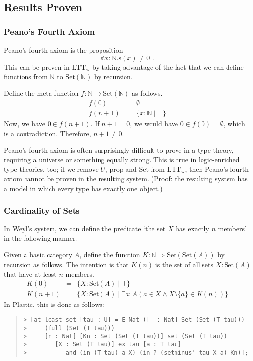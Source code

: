 \documentclass[acmtocl]{acmtrans2m}
\newcommand{\LTTW}{\ensuremath{\mathrm{LTT}_\mathrm{w}}}
\newcommand{\Set}[1]{\mathrm{Set} \left( {#1} \right)}
\newcommand{\s}{\mathrm{s}}
\newcommand{\p}{\mathrm{prop}}
\newcommand{\boldarrow}{\Rightarrow}
\begin{document}
\subsection{Results Proven}

\subsubsection{Peano's Fourth Axiom}
Peano's fourth axiom is the proposition
\[ \forall x : \mathbb{N}. \s(x) \neq 0 \enspace . \]
This can be proven in $\LTTW$ by taking advantage of the fact that we can define functions from $\mathbb{N}$ to $\Set{\mathbb{N}}$ by recursion.

Define the meta-function $f : \mathbb{N} \rightarrow \Set{\mathbb{N}}$ as follows.
\begin{eqnarray*}
f(0) & = & \emptyset \\
f(n+1) & = & \{ x : \mathbb{N} \mid \top \}
\end{eqnarray*}
Now, we have $0 \in f(n+1)$.  If $n+1 = 0$, we would have $0 \in f(0) = \emptyset$, which is a contradiction.  Therefore, $n+1 \neq 0$.

Peano's fourth axiom is often surprisingly difficult to prove in a type theory, requiring a universe or something equally strong.  This is true in logic-enriched type theories, too; if we remove $U$, $\p$ and $\mathrm{Set}$ from $\LTTW$, then Peano's fourth axiom cannot be proven in the resulting system.  (Proof: the resulting system has a model in which every type has exactly one object.)

\subsubsection{Cardinality of Sets}
\label{section:cardinality}

In Weyl's system, we can define the predicate `the set $X$ has
exactly $n$ members' in the following manner.

Given a basic category $A$, define the function $K : \mathbb{N}
\boldarrow \Set{\Set{A}}$ by recursion as follows.  The intention
is that $K(n)$ is the set of all sets $X : \Set{A}$ that have at
least $n$ members.
\begin{eqnarray*}
K(0) & = & \{ X : \Set{A} \mid \top \} \\
K(n+1) & = & \{ X : \Set{A} \mid \exists a:A (a \in X \wedge X \setminus \{a\} \in K(n)) \}
\end{eqnarray*}
In Plastic, this is done as follows:
\begin{quote}
 \begin{verbatim}
> [at_least_set [tau : U] = E_Nat ([_ : Nat] Set (Set (T tau)))
>     (full (Set (T tau)))
>     [n : Nat] [Kn : Set (Set (T tau))] set (Set (T tau))
>        [X : Set (T tau)] ex tau [a : T tau]
>           and (in (T tau) a X) (in ? (setminus' tau X a) Kn)];
\end{verbatim}
\end{quote}
\end{document}
